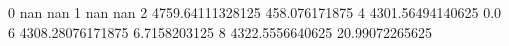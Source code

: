 0 nan nan
1 nan nan
2 4759.64111328125 458.076171875
4 4301.56494140625 0.0
6 4308.28076171875 6.7158203125
8 4322.5556640625 20.99072265625
